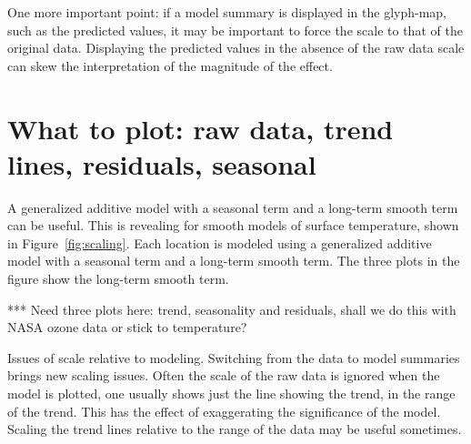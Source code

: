 \documentclass[oneside]{article}
\begin{document}


One more important point: if a model summary is displayed in the glyph-map, such as the predicted values, it may be important to force the scale to that of the original data. Displaying the predicted values in the absence of the raw data scale can skew the interpretation of the magnitude of the effect. 

\section{What to plot: raw data, trend lines, residuals,  seasonal}

A generalized additive model \citep{wood:2006} with a seasonal term and a long-term smooth term can be useful. This is revealing for smooth models of surface temperature, shown in Figure~\ref{fig:scaling}. Each location is modeled using a generalized additive model \citep{wood:2006} with a seasonal term and a long-term smooth term. The three plots in the figure show the long-term smooth term. %


*** Need three plots here: trend, seasonality and residuals, shall we do this with NASA ozone data or stick to temperature?

Issues of scale relative to modeling. Switching from the data to model summaries brings new scaling issues. Often the scale of the raw data is ignored when the model is plotted, one usually shows just the line showing the trend, in the range of the trend. This has the effect of exaggerating the significance of the model. Scaling the trend lines relative to the range of the data may be useful sometimes.
\end{document}
